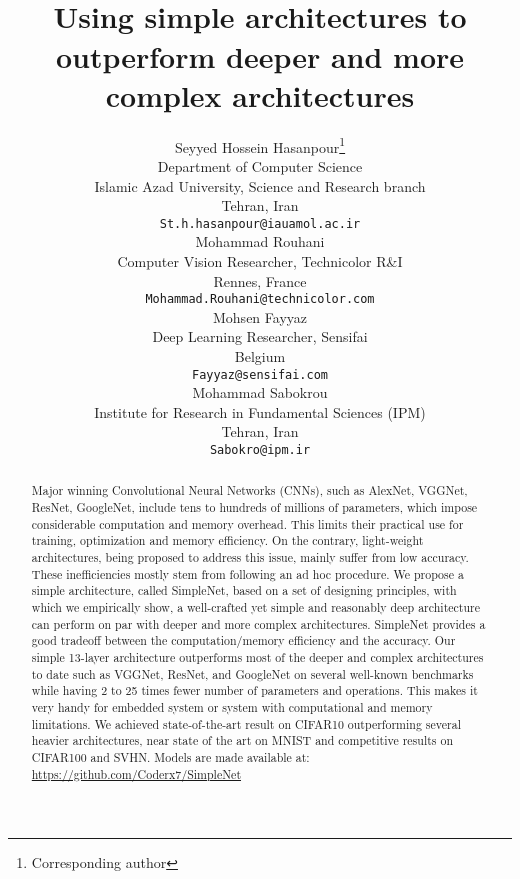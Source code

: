 \documentclass{article} \usepackage{lets_keepit_simple,times}
\title{\center{Let's keep it simple,}\\
 Using simple architectures to outperform deeper and more complex architectures 
}
\author{Seyyed Hossein Hasanpour\thanks{Corresponding author}  \\
Department of Computer Science\\
Islamic Azad University, Science and Research branch\\
Tehran, Iran\\
\texttt{St.h.hasanpour@iauamol.ac.ir} \\
\And
Mohammad Rouhani \\
Computer Vision Researcher, Technicolor R\&I\\
Rennes, France\\
\texttt{Mohammad.Rouhani@technicolor.com} \\
\And
Mohsen Fayyaz \\
Deep Learning Researcher, Sensifai \hspace{1cm}\hspace{1cm}\hspace{1cm}\\
Belgium\\
\texttt{Fayyaz@sensifai.com} \\
\And
Mohammad Sabokrou \\
Institute for Research in Fundamental Sciences (IPM)\\
Tehran, Iran\\
\texttt{Sabokro@ipm.ir}
}
\begin{document}
\maketitle

\begin{abstract}
Major winning Convolutional Neural Networks (CNNs), such as AlexNet, VGGNet, ResNet, GoogleNet, include tens to hundreds of millions of parameters, which impose considerable computation and memory overhead. This limits their practical use for training, optimization and memory efficiency. On the contrary, light-weight architectures, being proposed to address this issue, mainly suffer from low accuracy. These inefficiencies mostly stem from following an ad hoc procedure. We propose a simple architecture, called SimpleNet, based on a set of designing principles, with which we empirically show, a well-crafted yet simple and reasonably deep architecture can perform on par with deeper and more complex architectures. SimpleNet provides a good tradeoff between the computation/memory efficiency and the accuracy. Our simple 13-layer architecture outperforms most of the deeper and complex architectures to date such as VGGNet, ResNet, and GoogleNet on several well-known benchmarks while having 2 to 25 times fewer number of parameters and operations. This makes it very handy for embedded system or system with computational and memory limitations. We achieved state-of-the-art result on CIFAR10 outperforming several heavier architectures, near state of the art on MNIST and competitive results on CIFAR100 and SVHN. Models are made available at: \href{url}{https://github.com/Coderx7/SimpleNet} 
\end{abstract}
\end{document}
